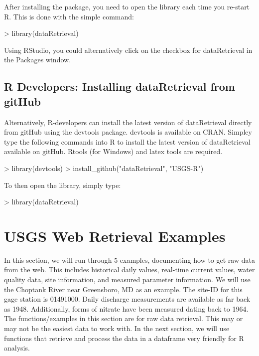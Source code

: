 \documentclass[a4paper,11pt]{article}
\begin{document}
After installing the package, you need to open the library each time you re-start R.  This is done with the simple command:
\begin{Schunk}
\begin{Sinput}
> library(dataRetrieval)
\end{Sinput}
\end{Schunk}
Using RStudio, you could alternatively click on the checkbox for dataRetrieval in the Packages window.

\subsection{R Developers: Installing dataRetrieval from gitHub}
Alternatively, R-developers can install the latest version of dataRetrieval directly from gitHub using the devtools package.  devtools is available on CRAN.  Simpley type the following commands into R to install the latest version of dataRetrieval available on gitHub.  Rtools (for Windows) and latex tools are required.

\begin{Schunk}
\begin{Sinput}
> library(devtools)
> install_github("dataRetrieval", "USGS-R")
\end{Sinput}
\end{Schunk}
To then open the library, simply type:

\begin{Schunk}
\begin{Sinput}
> library(dataRetrieval)
\end{Sinput}
\end{Schunk}

\newpage
\section{USGS Web Retrieval Examples}
In this section, we will run through 5 examples, documenting how to get raw data from the web. This includes historical daily values, real-time current values, water quality data, site information, and measured parameter information. We will use the Choptank River near Greensboro, MD as an example.  The site-ID for this gage station is 01491000. Daily discharge measurements are available as far back as 1948.  Additionally, forms of nitrate have been measured dating back to 1964. The functions/examples in this section are for raw data retrieval.  This may or may not be the easiest data to work with.  In the next section, we will use functions that retrieve and process the data in a dataframe very friendly for R analysis.
\end{document}
